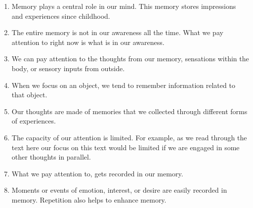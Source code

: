 \documentclass[reprint,amsmath,amssymb,apr,aip,onecolumn, 11pt]{revtex4-1}
\begin{document}
	\begin{enumerate}
		\item Memory plays a central role in our mind. This memory stores impressions and experiences since childhood. 
		
		\item	The entire memory is not in our awareness all the time. What we pay attention to right now is what is in our awareness. 
		
		\item	We can pay attention to the thoughts from our memory,  sensations within the body, or sensory inputs from outside.
		
		\item When we  focus on an object, we tend to remember information related to that object.  
		
		\item	Our thoughts are made of memories that we collected through different forms of experiences. 
		
		\item	The capacity of our attention is limited. For example, as we read through the text here our focus on this text would be limited if we are engaged in some other thoughts in parallel. 
		
		\item	What we pay attention to, gets recorded in our memory.  
		
		\item	Moments or events of emotion, interest, or desire are easily recorded in memory. Repetition also helps to enhance memory.
	 	
	 	
	 	
	 \end{enumerate}
	
\end{document}
